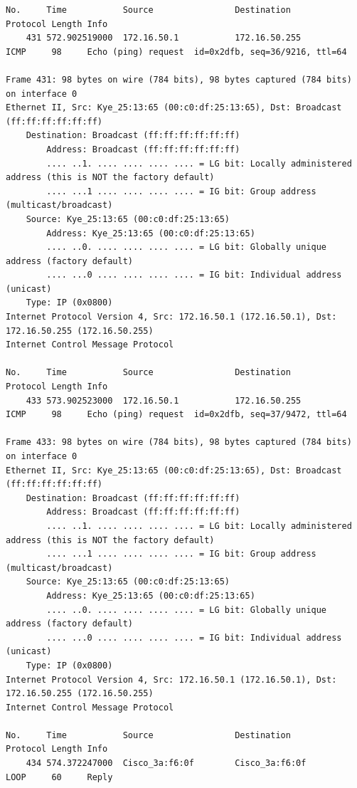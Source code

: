 \documentclass[a4paper,11pt]{article}
\begin{document}
\begin{lstlisting}
No.     Time           Source                Destination           Protocol Length Info
    431 572.902519000  172.16.50.1           172.16.50.255         ICMP     98     Echo (ping) request  id=0x2dfb, seq=36/9216, ttl=64

Frame 431: 98 bytes on wire (784 bits), 98 bytes captured (784 bits) on interface 0
Ethernet II, Src: Kye_25:13:65 (00:c0:df:25:13:65), Dst: Broadcast (ff:ff:ff:ff:ff:ff)
    Destination: Broadcast (ff:ff:ff:ff:ff:ff)
        Address: Broadcast (ff:ff:ff:ff:ff:ff)
        .... ..1. .... .... .... .... = LG bit: Locally administered address (this is NOT the factory default)
        .... ...1 .... .... .... .... = IG bit: Group address (multicast/broadcast)
    Source: Kye_25:13:65 (00:c0:df:25:13:65)
        Address: Kye_25:13:65 (00:c0:df:25:13:65)
        .... ..0. .... .... .... .... = LG bit: Globally unique address (factory default)
        .... ...0 .... .... .... .... = IG bit: Individual address (unicast)
    Type: IP (0x0800)
Internet Protocol Version 4, Src: 172.16.50.1 (172.16.50.1), Dst: 172.16.50.255 (172.16.50.255)
Internet Control Message Protocol

No.     Time           Source                Destination           Protocol Length Info
    433 573.902523000  172.16.50.1           172.16.50.255         ICMP     98     Echo (ping) request  id=0x2dfb, seq=37/9472, ttl=64

Frame 433: 98 bytes on wire (784 bits), 98 bytes captured (784 bits) on interface 0
Ethernet II, Src: Kye_25:13:65 (00:c0:df:25:13:65), Dst: Broadcast (ff:ff:ff:ff:ff:ff)
    Destination: Broadcast (ff:ff:ff:ff:ff:ff)
        Address: Broadcast (ff:ff:ff:ff:ff:ff)
        .... ..1. .... .... .... .... = LG bit: Locally administered address (this is NOT the factory default)
        .... ...1 .... .... .... .... = IG bit: Group address (multicast/broadcast)
    Source: Kye_25:13:65 (00:c0:df:25:13:65)
        Address: Kye_25:13:65 (00:c0:df:25:13:65)
        .... ..0. .... .... .... .... = LG bit: Globally unique address (factory default)
        .... ...0 .... .... .... .... = IG bit: Individual address (unicast)
    Type: IP (0x0800)
Internet Protocol Version 4, Src: 172.16.50.1 (172.16.50.1), Dst: 172.16.50.255 (172.16.50.255)
Internet Control Message Protocol

No.     Time           Source                Destination           Protocol Length Info
    434 574.372247000  Cisco_3a:f6:0f        Cisco_3a:f6:0f        LOOP     60     Reply


\end{lstlisting}
\end{document}
